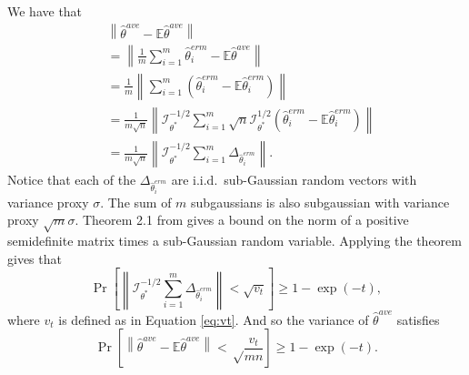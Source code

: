 \documentclass[twoside]{article}
\newcommand{\E}{\mathbb{E}}
\newcommand{\w}{\theta}
\newcommand{\wave}{\hat\w^{ave}}
\newcommand{\wmle}{\hat\w^{erm}}
\newcommand{\wstar}{{\w^{*}}}
\newcommand{\I}{\mathcal I}
\newcommand{\ltwo}[1]{{\lVert {#1} \rVert}}
\newcommand{\ltwobig}[1]{{\left\lVert {#1} \right\rVert}}
\newcommand{\prob}[1]{\Pr\left[{#1}\right]}
\begin{document}
We have that
\begin{align}
&\ltwobig{\wave-\E\wave}
\\&=
\ltwobig{\frac{1}{m}\sum_{i=1}^m\wmle_i-\E\wave}
\label{eq:var1}
\\&=
\frac{1}{m}\ltwobig{\sum_{i=1}^m\left(\wmle_i-\E\wmle_i\right)}
\\&=
\frac{1}{m\sqrt{n}}\ltwobig{\I^{-1/2}_\wstar\sum_{i=1}^m\sqrt{n}\I^{1/2}_\wstar\left(\wmle_i-\E\wmle_i\right)}
\\&=
\frac{1}{m\sqrt{n}}\ltwobig{\I^{-1/2}_\wstar\sum_{i=1}^m\Delta_{\wmle_i}}
\label{eq:var1}
.
\end{align}
Notice that each of the $\Delta_{\wmle_i}$ are i.i.d.\ sub-Gaussian random vectors with variance proxy $\sigma$.
The sum of $m$ subgaussians is also subgaussian with variance proxy $\sqrt{m}\sigma$.
Theorem 2.1 from \citet{hsu2012tail} gives a bound on the norm of a positive semidefinite matrix times a sub-Gaussian random variable.
Applying the theorem gives that %
\begin{equation}
\prob{
    \ltwobig{\I^{-1/2}_\wstar\sum_{i=1}^m\Delta_{\wmle_i}} < \sqrt{v_t}
}
\ge 1-\exp(-t)
,
\end{equation}
where $v_t$ is defined as in Equation \ref{eq:vt}.
And so the variance of $\wave$ satisfies
\begin{equation}
\prob{
\ltwobig{\wave-\E\wave}
<
\sqrt\frac{v_t}{{mn}}
}
\ge 1-\exp(-t)
.
\label{eq:ct1}
\end{equation}
\end{document}

